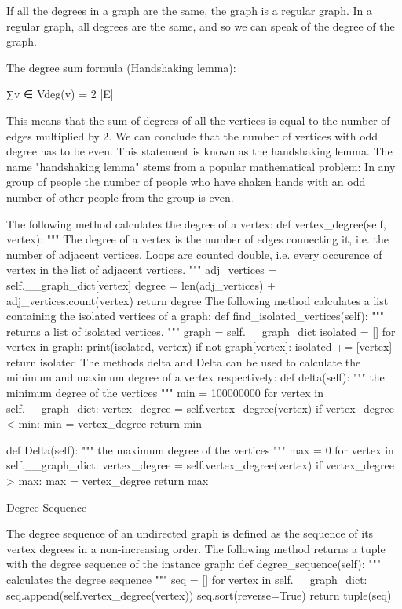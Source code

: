 If all the degrees in a graph are the same, the graph is a regular graph. In a regular graph, all degrees are the same, and so we can speak of the degree of the graph. 


The degree sum formula (Handshaking lemma): 

∑v ∈ Vdeg(v) = 2 |E| 

This means that the sum of degrees of all the vertices is equal to the number of edges multiplied by 2. We can conclude that the number of vertices with odd degree has to be even. This statement is known as the handshaking lemma. The name "handshaking lemma" stems from a popular mathematical problem: In any group of people the number of people who have shaken hands with an odd number of other people from the group is even. 

The following method calculates the degree of a vertex: 
    def vertex_degree(self, vertex):
        """ The degree of a vertex is the number of edges connecting
            it, i.e. the number of adjacent vertices. Loops are counted 
            double, i.e. every occurence of vertex in the list 
            of adjacent vertices. """ 
        adj_vertices =  self.__graph_dict[vertex]
        degree = len(adj_vertices) + adj_vertices.count(vertex)
        return degree
The following method calculates a list containing the isolated vertices of a graph:
    def find_isolated_vertices(self):
        """ returns a list of isolated vertices. """
        graph = self.__graph_dict
        isolated = []
        for vertex in graph:
            print(isolated, vertex)
            if not graph[vertex]:
                isolated += [vertex]
        return isolated
The methods delta and Delta can be used to calculate the minimum and maximum degree of a vertex respectively:
    def delta(self):
        """ the minimum degree of the vertices """
        min = 100000000
        for vertex in self.__graph_dict:
            vertex_degree = self.vertex_degree(vertex)
            if vertex_degree < min:
                min = vertex_degree
        return min
        
    def Delta(self):
        """ the maximum degree of the vertices """
        max = 0
        for vertex in self.__graph_dict:
            vertex_degree = self.vertex_degree(vertex)
            if vertex_degree > max:
                max = vertex_degree
        return max


Degree Sequence

The degree sequence of an undirected graph is defined as the sequence of its vertex degrees in a non-increasing order. 
The following method returns a tuple with the degree sequence of the instance graph:
    def degree_sequence(self):
        """ calculates the degree sequence """
        seq = []
        for vertex in self.__graph_dict:
            seq.append(self.vertex_degree(vertex))
        seq.sort(reverse=True)
        return tuple(seq)

